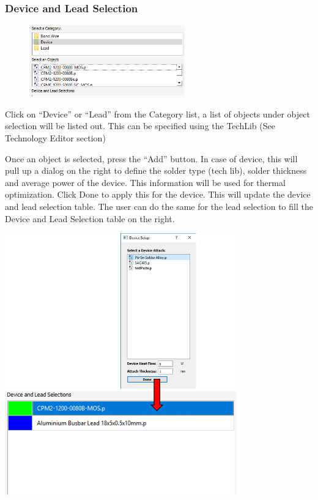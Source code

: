 \documentclass[11pt]{article}
\begin{document}
\pagebreak

\subsubsection{Device and Lead Selection}
\label{sec-2-3-4}

\begin{figure}
\centering
\includegraphics[width=0.6\textwidth]{./figs/08_Components2.png}
\end{figure}

Click on “Device” or “Lead” from the Category list, a list of objects under object selection will be listed out. This can be specified using the TechLib (See Technology Editor section)

Once an object is selected, press the “Add” button. In case of device, this will pull up a dialog on the right to define the solder type (tech lib), solder thickness and average power of the device. This information will be used for thermal optimization. Click Done to apply this for the device. This will update the device and lead selection table. 
The user can do the same for the lead selection to fill the Device and Lead Selection table on the right.

\begin{center}
\includegraphics[width=10cm]{./figs/09_DeviceSetup.png}
\end{center}
\end{document}
